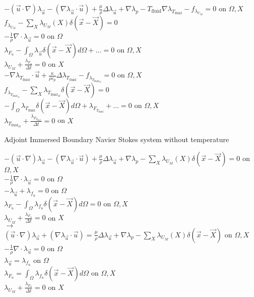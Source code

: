 \documentclass[10pt]{article} %
\begin{document}
\begin{center}
	$-(\vec{u}\cdot\nabla) \lambda_{\vec{u}} - \left(\nabla \lambda_{\vec{u}} \cdot \vec{u}\right) + \frac{\mu}{\rho} \Delta \lambda_{\vec{u}} + \nabla\lambda_p - T_{\text{fluid}} \nabla \lambda_{T_{\text{fluid}}} - f_{\lambda_{U_M}} = 0$ \quad on $\Omega,X$\\
	$f_{\lambda_{U_M}} - \sum_X \lambda_{U_M}(X) \delta(\vec{x}-\vec{X}) = 0$\\
	$-\frac{1}{\rho} \nabla \cdot \lambda_{\vec{u}} = 0$ \quad on $\Omega$\\
	$\lambda_{F_u} - \int_{\Omega} \lambda_{\vec{u}} \delta (\vec{x}-\vec{X}) d\Omega + ... = 0$ \quad on $\Omega,X$\\
	$\lambda_{U_M} + \frac{\lambda_{F_u}}{\Delta t}=0$ \quad on $X$\\
	$-\nabla \lambda_{T_{\text{fluid}}} \cdot \vec{u} + \frac{\kappa}{\rho c_p} \Delta  \lambda_{T_{\text{fluid}}} - f_{\lambda_{T_{\text{fluid}_M}}} = 0$ \quad on $\Omega,X$\\
	$f_{\lambda_{T_{\text{fluid}_M}}} - \sum_{X} \lambda_{T_{\text{fluid}_M}} \delta (\vec{x}-\vec{X}) = 0$\\
	$-\int_{\Omega} \lambda_{T_{\text{fluid}}} \delta (\vec{x}-\vec{X}) d\Omega + \lambda_{F_{T_{\text{fluid}}}} + ... = 0$ \quad on $\Omega, X$\\
	$\lambda_{T_{\text{fluid}_M}} + \frac{\lambda_{F_{T_{\text{fluid}}}}}{\Delta t} =0$ \quad on $X$
	
\begin{flushleft}
	Adjoint Immersed Boundary Navier Stokes system without temperature
\end{flushleft}
	$-(\vec{u}\cdot\nabla) \lambda_{\vec{u}} - \left(\nabla \lambda_{\vec{u}} \cdot \vec{u}\right) + \frac{\mu}{\rho} \Delta \lambda_{\vec{u}} + \nabla\lambda_p - \sum_X \lambda_{U_M}(X) \delta(\vec{x}-\vec{X}) = 0$ \quad on $\Omega,X$\\
	$-\frac{1}{\rho} \nabla \cdot \lambda_{\vec{u}} = 0$ \quad on $\Omega$\\
	$-\lambda_{\vec{u}} + \lambda_{f_u} = 0$ \quad on $\Omega$\\
	$\lambda_{F_u} - \int_{\Omega} \lambda_{f_u} \delta (\vec{x}-\vec{X}) d\Omega = 0$ \quad on $\Omega,X$\\
	$\lambda_{U_M} + \frac{\lambda_{F_u}}{\Delta t}=0$ \quad on $X$\\
	$\rightarrow$\\
	$(\vec{u}\cdot\nabla) \lambda_{\vec{u}} + \left(\nabla \lambda_{\vec{u}} \cdot \vec{u}\right) = \frac{\mu}{\rho} \Delta \lambda_{\vec{u}} + \nabla\lambda_p - \sum_X \lambda_{U_M}(X) \delta(\vec{x}-\vec{X})$ \quad on $\Omega,X$\\
	$-\frac{1}{\rho} \nabla \cdot \lambda_{\vec{u}} = 0$ \quad on $\Omega$\\
	$\lambda_{\vec{u}} = \lambda_{f_u} $ \quad on $\Omega$\\
	$\lambda_{F_u} = \int_{\Omega} \lambda_{f_u} \delta (\vec{x}-\vec{X}) d\Omega$ \quad on $\Omega,X$\\
	$\lambda_{U_M} + \frac{\lambda_{F_u}}{\Delta t}=0$ \quad on $X$\\
\end{center}
\newpage
\end{document}
